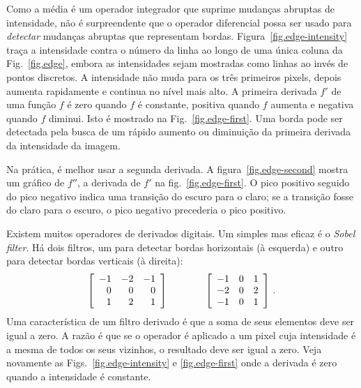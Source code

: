 Como a média é um operador integrador que suprime mudanças abruptas de intensidade, não é surpreendente que o operador diferencial possa ser usado para \emph{detectar} mudanças abruptas que representam bordas. Figura~\ref{fig.edge-intensity} traça a intensidade contra o número da linha ao longo de uma única coluna da Fig.~\ref{fig.edge}, embora as intensidades sejam mostradas como linhas ao invés de pontos discretos. A intensidade não muda para os três primeiros pixels, depois aumenta rapidamente e continua no nível mais alto. A primeira derivada $f'$ de uma função $f$ é zero quando $f$ é constante, positiva quando $f$ aumenta e negativa quando $f$ diminui. Isto é mostrado na Fig.~\ref{fig.edge-first}. Uma borda pode ser detectada pela busca de um rápido aumento ou diminuição da primeira derivada da intensidade da imagem.

Na prática, é melhor usar a segunda derivada. A figura~\ref{fig.edge-second} mostra um gráfico de $f''$, a derivada de $f'$ na fig.~\ref{fig.edge-first}. O pico positivo seguido do pico negativo indica uma transição do escuro para o claro; se a transição fosse do claro para o escuro, o pico negativo precederia o pico positivo.

Existem muitos operadores de derivados digitais. Um simples mas eficaz é o \emph{Sobel filter}. Há dois filtros, um para detectar bordas horizontais (à esquerda) e outro para detectar bordas verticais (à direita):
\[
\begin{array}{c@{\hspace{4em}}c}
\left[
\begin{array}{rrr}
-1 & -2 & -1\\
0 & 0 & 0\\
1 & 2 & 1\\
\end{array}
\right]
&
\left[
\begin{array}{rrr}
-1 & 0 & 1\\
-2 & 0 & 2\\
-1 & 0 & 1\\
\end{array}
\right]\,.
\end{array}
\]
Uma característica de um filtro derivado é que a soma de seus elementos deve ser igual a zero. A razão é que se o operador é aplicado a um pixel cuja intensidade é a mesma de todos os seus vizinhos, o resultado deve ser igual a zero. Veja novamente as Figs.~\ref{fig.edge-intensity} e \ref{fig.edge-first} onde a derivada é zero quando a intensidade é constante.

